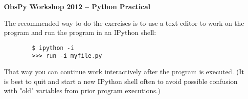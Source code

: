 \documentclass{article}
\begin{document}
\vspace*{1cm}
\begin{center}
\textbf{\Large ObsPy Workshop 2012 -- Python Practical}
\end{center}
\vspace*{1cm}

\noindent The recommended way to do the exercises is to use a text editor to
work on the program and run the program in an IPython shell:
\begin{verbatim}
        $ ipython -i
        >>> run -i myfile.py
\end{verbatim}
That way you can continue work interactively after the program is executed. (It
is best to quit and start a new IPython shell often to avoid possible confusion
with "old" variables from prior program executions.)
\end{document}
